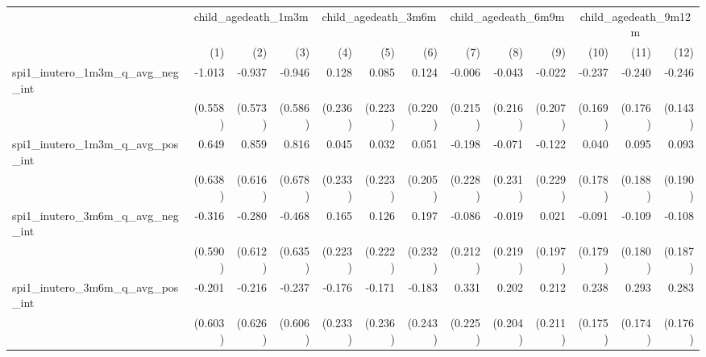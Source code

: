 \begin{tabular}{lrrrrrrrrrrrr}
\toprule
                                            &  \multicolumn{3}{c}{child\_agedeath\_1m3m} &  \multicolumn{3}{c}{child\_agedeath\_3m6m} &  \multicolumn{3}{c}{child\_agedeath\_6m9m} & \multicolumn{3}{c}{child\_agedeath\_9m12m} \\ 
\cmidrule(lr){2-4} \cmidrule(lr){5-7} \cmidrule(lr){8-10} \cmidrule(lr){11-13} 
                                            &          (1) &          (2) &          (3) &          (4) &          (5) &          (6) &          (7) &          (8) &          (9) &         (10) &         (11) &         (12) \\ 
\midrule
spi1\_inutero\_1m3m\_q\_avg\_neg\_int       &       -1.013 &       -0.937 &       -0.946 &        0.128 &        0.085 &        0.124 &       -0.006 &       -0.043 &       -0.022 &       -0.237 &       -0.240 &       -0.246 \\ 
                                            &      (0.558) &      (0.573) &      (0.586) &      (0.236) &      (0.223) &      (0.220) &      (0.215) &      (0.216) &      (0.207) &      (0.169) &      (0.176) &      (0.143) \\ 
spi1\_inutero\_1m3m\_q\_avg\_pos\_int       &        0.649 &        0.859 &        0.816 &        0.045 &        0.032 &        0.051 &       -0.198 &       -0.071 &       -0.122 &        0.040 &        0.095 &        0.093 \\ 
                                            &      (0.638) &      (0.616) &      (0.678) &      (0.233) &      (0.223) &      (0.205) &      (0.228) &      (0.231) &      (0.229) &      (0.178) &      (0.188) &      (0.190) \\ 
spi1\_inutero\_3m6m\_q\_avg\_neg\_int       &       -0.316 &       -0.280 &       -0.468 &        0.165 &        0.126 &        0.197 &       -0.086 &       -0.019 &        0.021 &       -0.091 &       -0.109 &       -0.108 \\ 
                                            &      (0.590) &      (0.612) &      (0.635) &      (0.223) &      (0.222) &      (0.232) &      (0.212) &      (0.219) &      (0.197) &      (0.179) &      (0.180) &      (0.187) \\ 
spi1\_inutero\_3m6m\_q\_avg\_pos\_int       &       -0.201 &       -0.216 &       -0.237 &       -0.176 &       -0.171 &       -0.183 &        0.331 &        0.202 &        0.212 &        0.238 &        0.293 &        0.283 \\ 
                                            &      (0.603) &      (0.626) &      (0.606) &      (0.233) &      (0.236) &      (0.243) &      (0.225) &      (0.204) &      (0.211) &      (0.175) &      (0.174) &      (0.176) \\ 

\end{tabular}

